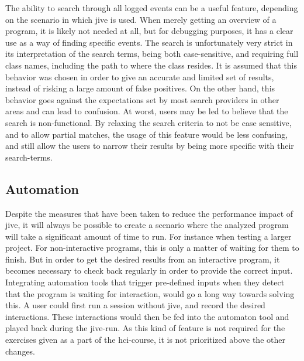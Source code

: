 The ability to search through all logged events can be a useful feature, depending on the scenario in which \gls{jive} is used.
When merely getting an overview of a program, it is likely not needed at all, but for debugging purposes, it has a clear use as a way of finding specific events.
The search is unfortunately very strict in its interpretation of the search terms, being both case-sensitive, and requiring full class names, including the path to where the class resides.
It is assumed that this behavior was chosen in order to give an accurate and limited set of results, instead of risking a large amount of false positives.
On the other hand, this behavior goes against the expectations set by most search providers in other areas and can lead to confusion.
At worst, users may be led to believe that the search is non-functional.
By relaxing the search criteria to not be case sensitive, and to allow partial matches, the usage of this feature would be less confusing, and still allow the users to narrow their results by being more specific with their search-terms.

\subsection{Automation}\label{jiveSuggestionsAutomation}

Despite the measures that have been taken to reduce the performance impact of \gls{jive}, it will always be possible to create a scenario where the analyzed program will take a significant amount of time to run.
For instance when testing a larger project.
For non-interactive programs, this is only a matter of waiting for them to finish.
But in order to get the desired results from an interactive program, it becomes necessary to check back regularly in order to provide the correct input.
Integrating automation tools that trigger pre-defined inputs when they detect that the program is waiting for interaction, would go a long way towards solving this.
A user could first run a session without \gls{jive}, and record the desired interactions.
These interactions would then be fed into the automaton tool and played back during the \gls{jive}-run.
As this kind of feature is not required for the exercises given as a part of the \gls{hci}-course, it is not prioritized above the other changes.





